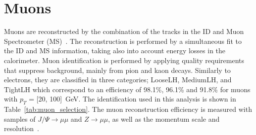 \section{Muons}
Muons are reconstructed by the combination of the tracks in the ID and Muon Spectrometer (MS)~\cite{PERF-2015-10}. 
The reconstruction is performed by a simultaneous fit to the ID and MS information, taking also into account energy losses in the calorimeter.
Muon identification is performed by applying quality requirements that suppress background, mainly from pion and kaon decays. 
Similarly to electrons, they are classified in three categories; LooseLH, MediumLH, and TightLH which correspond to an efficiency of 98.1\%, 96.1\% and 91.8\% for muons with $p_T$ = [20, 100]~GeV.
The identification used in this analysis is shown in Table~\ref{tab:muon_selection}.
The muon reconstruction efficiency is measured with samples of $J/\Psi \rightarrow \mu\mu$ and $Z\rightarrow \mu\mu$, as well as the momentum scale and resolution~\cite{MUON-2018-03}.
